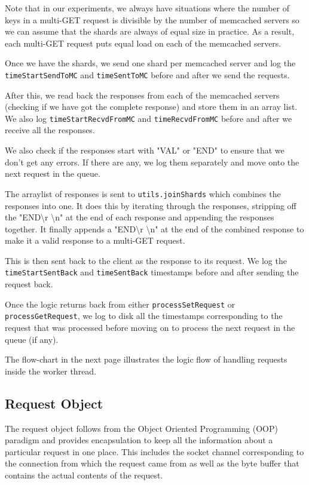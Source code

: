 \documentclass[11pt,a4paper]{article}
\begin{document}
	Note that in our experiments, we always have situations where the number of keys in a multi-GET request is divisible by the number of memcached servers so we can assume that the shards are always of equal size in practice. As a result, each multi-GET request puts equal load on each of the memcached servers.
	
	Once we have the shards, we send one shard per memcached server and log the \texttt{timeStartSendToMC} and \texttt{timeSentToMC} before and after we send the requests.
	
	After this, we read back the responses from each of the memcached servers (checking if we have got the complete response) and store them in an array list. We also log \texttt{timeStartRecvdFromMC} and \texttt{timeRecvdFromMC} before and after we receive all the responses. 
	
	We also check if the responses start with "VAL" or "END" to ensure that we don't get any errors. If there are any, we log them separately and move onto the next request in the queue.
	
	The arraylist of responses is sent to \texttt{utils.joinShards} which combines the responses into one. It does this by iterating through the responses, stripping off the "END\textbackslash r \textbackslash n" at the end of each response and appending the responses together. It finally appends a "END\textbackslash r \textbackslash n" at the end of the combined response to make it a valid response to a multi-GET request.  
	
	This is then sent back to the client as the response to its request. We log the \texttt{timeStartSentBack} and \texttt{timeSentBack} timestamps before and after sending the request back.
	
	Once the logic returns back from either \texttt{processSetRequest} or \texttt{processGetRequest}, we log to disk all the timestamps corresponding to the request that was processed before moving on to process the next request in the queue (if any). 
	
	The flow-chart in the next page illustrates the logic flow of handling requests inside the worker thread.


\subsection{Request Object}
The request object follows from the Object Oriented Programming (OOP) paradigm and provides encapsulation to keep all the information about a particular request in one place. This includes the socket channel corresponding to the connection from which the request came from as well as the byte buffer that contains the actual contents of the request.
\end{document}
